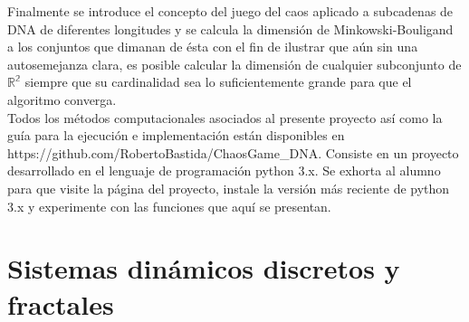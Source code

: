 \documentclass[letterpaper,12pt,oneside]{book}
\begin{document}
Finalmente se introduce el concepto del juego del caos aplicado a subcadenas de DNA de diferentes longitudes y se calcula la dimensión de Minkowski-Bouligand a los conjuntos que dimanan de ésta con el fin de ilustrar que aún sin una autosemejanza clara, es posible calcular la dimensión de cualquier subconjunto de $\mathbb{R^{2}}$ siempre que su cardinalidad sea lo suficientemente grande para que el algoritmo converga.
\\

Todos los métodos computacionales asociados al presente proyecto así como la guía para la ejecución e implementación están disponibles en https://github.com/RobertoBastida/ChaosGame_DNA. Consiste en un proyecto desarrollado en el lenguaje de programación python 3.x.
Se exhorta al alumno para que visite la página del proyecto, instale la versión más reciente de python 3.x y experimente con las funciones que aquí se presentan.

\chapter{Sistemas dinámicos discretos y fractales}


\\

\\
\end{document}
